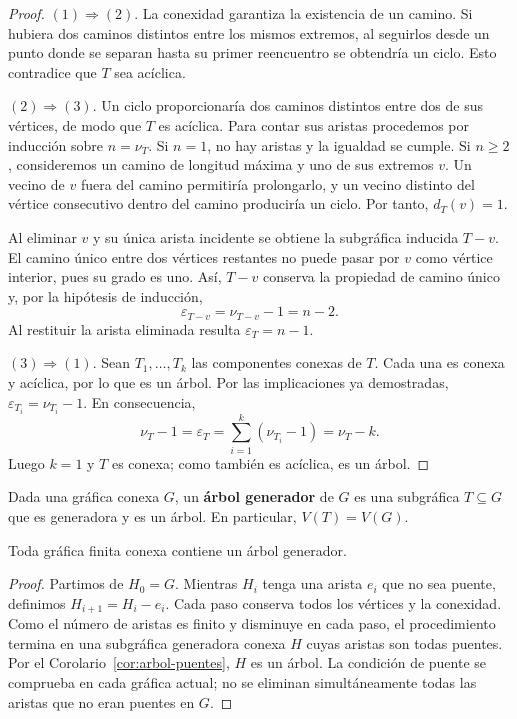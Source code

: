 \begin{proof}
$(1)\Rightarrow(2)$. La conexidad garantiza la existencia de un camino. Si hubiera dos caminos distintos entre los mismos extremos, al seguirlos desde un punto donde se separan hasta su primer reencuentro se obtendría un ciclo. Esto contradice que $T$ sea acíclica.

$(2)\Rightarrow(3)$. Un ciclo proporcionaría dos caminos distintos entre dos de sus vértices, de modo que $T$ es acíclica. Para contar sus aristas procedemos por inducción sobre $n=\nu_T$. Si $n=1$, no hay aristas y la igualdad se cumple. Si $n\geq2$, consideremos un camino de longitud máxima y uno de sus extremos $v$. Un vecino de $v$ fuera del camino permitiría prolongarlo, y un vecino distinto del vértice consecutivo dentro del camino produciría un ciclo. Por tanto, $d_T(v)=1$.

Al eliminar $v$ y su única arista incidente se obtiene la subgráfica inducida $T-v$. El camino único entre dos vértices restantes no puede pasar por $v$ como vértice interior, pues su grado es uno. Así, $T-v$ conserva la propiedad de camino único y, por la hipótesis de inducción,
\[
\varepsilon_{T-v}=\nu_{T-v}-1=n-2.
\]
Al restituir la arista eliminada resulta $\varepsilon_T=n-1$.

$(3)\Rightarrow(1)$. Sean $T_1,\ldots,T_k$ las componentes conexas de $T$. Cada una es conexa y acíclica, por lo que es un árbol. Por las implicaciones ya demostradas, $\varepsilon_{T_i}=\nu_{T_i}-1$. En consecuencia,
\[
\nu_T-1=\varepsilon_T
=\sum_{i=1}^{k}(\nu_{T_i}-1)=\nu_T-k.
\]
Luego $k=1$ y $T$ es conexa; como también es acíclica, es un árbol.
\end{proof}

\begin{definition}
\label{def:arbol-generador}
Dada una gráfica conexa $G$, un \textbf{árbol generador} de $G$ es una subgráfica $T\subseteq G$ que es generadora y es un árbol. En particular, $V(T)=V(G)$.
\end{definition}

\begin{teorema}
\label{teo:existencia-arbol-generador}
Toda gráfica finita conexa contiene un árbol generador.
\end{teorema}
\begin{proof}
Partimos de $H_0=G$. Mientras $H_i$ tenga una arista $e_i$ que no sea puente, definimos $H_{i+1}=H_i-e_i$. Cada paso conserva todos los vértices y la conexidad. Como el número de aristas es finito y disminuye en cada paso, el procedimiento termina en una subgráfica generadora conexa $H$ cuyas aristas son todas puentes. Por el Corolario~\ref{cor:arbol-puentes}, $H$ es un árbol. La condición de puente se comprueba en cada gráfica actual; no se eliminan simultáneamente todas las aristas que no eran puentes en $G$.
\end{proof}

